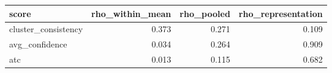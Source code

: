 \begin{tabular}{lrrr}
\toprule
score & rho\_within\_mean & rho\_pooled & rho\_representation \\
\midrule
cluster\_consistency & 0.373 & 0.271 & 0.109 \\
avg\_confidence & 0.034 & 0.264 & 0.909 \\
atc & 0.013 & 0.115 & 0.682 \\
\bottomrule
\end{tabular}
